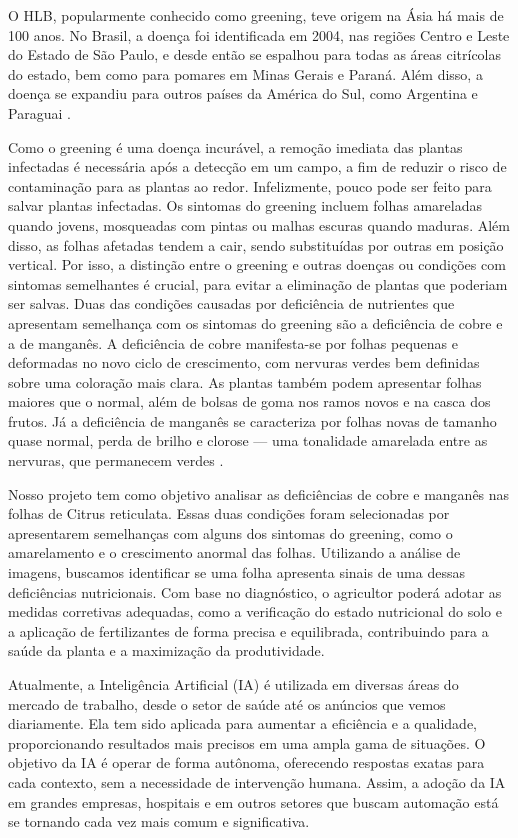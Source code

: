 O HLB, popularmente conhecido como greening, teve origem na Ásia há mais de 100 anos. No Brasil, a doença foi identificada em 2004, nas regiões Centro e Leste do Estado de São Paulo, e desde então se espalhou para todas as áreas citrícolas do estado, bem como para pomares em Minas Gerais e Paraná. Além disso, a doença se expandiu para outros países da América do Sul, como Argentina e Paraguai \cite{IntroduçãoGreening}. 

Como o greening é uma doença incurável, a remoção imediata das plantas infectadas é necessária após a detecção em um campo, a fim de reduzir o risco de contaminação para as plantas ao redor. Infelizmente, pouco pode ser feito para salvar plantas infectadas. Os sintomas do greening incluem folhas amareladas quando jovens, mosqueadas com pintas ou malhas escuras quando maduras. Além disso, as folhas afetadas tendem a cair, sendo substituídas por outras em posição vertical. Por isso, a distinção entre o greening e outras doenças ou condições com sintomas semelhantes é crucial, para evitar a eliminação de plantas que poderiam ser salvas. Duas das condições causadas por deficiência de nutrientes que apresentam semelhança com os sintomas do greening são a deficiência de cobre e a de manganês. A deficiência de cobre manifesta-se por folhas pequenas e deformadas no novo ciclo de crescimento, com nervuras verdes bem definidas sobre uma coloração mais clara. As plantas também podem apresentar folhas maiores que o normal, além de bolsas de goma nos ramos novos e na casca dos frutos. Já a deficiência de manganês se caracteriza por folhas novas de tamanho quase normal, perda de brilho e clorose — uma tonalidade amarelada entre as nervuras, que permanecem verdes \cite{IntroduçãoGreening, IntroduçãoDeficiencias}.

Nosso projeto tem como objetivo analisar as deficiências de cobre e manganês nas folhas de Citrus reticulata. Essas duas condições foram selecionadas por apresentarem semelhanças com alguns dos sintomas do greening, como o amarelamento e o crescimento anormal das folhas. Utilizando a análise de imagens, buscamos identificar se uma folha apresenta sinais de uma dessas deficiências nutricionais. Com base no diagnóstico, o agricultor poderá adotar as medidas corretivas adequadas, como a verificação do estado nutricional do solo e a aplicação de fertilizantes de forma precisa e equilibrada, contribuindo para a saúde da planta e a maximização da produtividade.

Atualmente, a Inteligência Artificial (IA) é utilizada em diversas áreas do mercado de trabalho, desde o setor de saúde até os anúncios que vemos diariamente. Ela tem sido aplicada para aumentar a eficiência e a qualidade, proporcionando resultados mais precisos em uma ampla gama de situações. O objetivo da IA é operar de forma autônoma, oferecendo respostas exatas para cada contexto, sem a necessidade de intervenção humana. Assim, a adoção da IA em grandes empresas, hospitais e em outros setores que buscam automação está se tornando cada vez mais comum e significativa.

